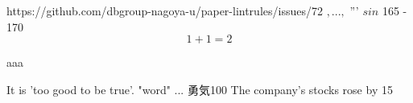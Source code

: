 https://github.com/dbgroup-nagoya-u/paper-lintrules/issues/72%
$, ... ,$%
'''%
\sloppy%
\def\ABP{Alexandroff-Bakelman-Pucciの不等式}%
$sin$%
165 - 170%
$$ 1 + 1 = 2 $$%
\begin{center}
    aaa
\end{center}%
It is 'too good to be true'.%
"word"%
...%
勇気100%
The company's stocks rose by 15%
